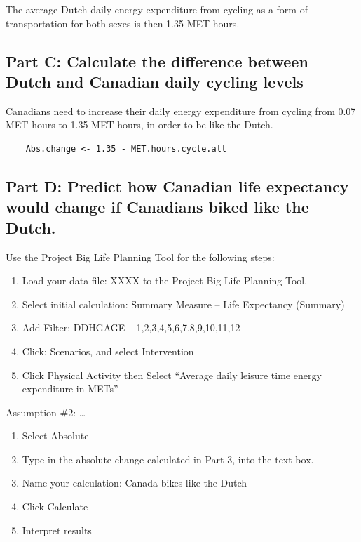 \documentclass[]{book}
\begin{document}
The average Dutch daily energy expenditure from cycling as a form of
transportation for both sexes is then 1.35 MET-hours.

\subsection{Part C: Calculate the difference between Dutch and Canadian
daily cycling
levels}\label{part-c-calculate-the-difference-between-dutch-and-canadian-daily-cycling-levels}

Canadians need to increase their daily energy expenditure from cycling
from 0.07 MET-hours to 1.35 MET-hours, in order to be like the Dutch.

\begin{verbatim}
    Abs.change <- 1.35 - MET.hours.cycle.all
\end{verbatim}

\subsection{Part D: Predict how Canadian life expectancy would change if
Canadians biked like the
Dutch.}\label{part-d-predict-how-canadian-life-expectancy-would-change-if-canadians-biked-like-the-dutch.}

Use the Project Big Life Planning Tool for the following steps:

\begin{enumerate}
\def\labelenumi{\arabic{enumi}.}
\item
  Load your data file: XXXX to the Project Big Life Planning Tool.
\item
  Select initial calculation: Summary Measure -- Life Expectancy
  (Summary)
\item
  Add Filter: DDHGAGE -- 1,2,3,4,5,6,7,8,9,10,11,12
\item
  Click: Scenarios, and select Intervention
\item
  Click Physical Activity then Select ``Average daily leisure time
  energy expenditure in METs''
\end{enumerate}

Assumption \#2: \ldots{}

\begin{enumerate}
\def\labelenumi{\arabic{enumi}.}
\setcounter{enumi}{5}
\item
  Select Absolute
\item
  Type in the absolute change calculated in Part 3, into the text box.
\item
  Name your calculation: Canada bikes like the Dutch
\item
  Click Calculate
\item
  Interpret results
\end{enumerate}
\end{document}
